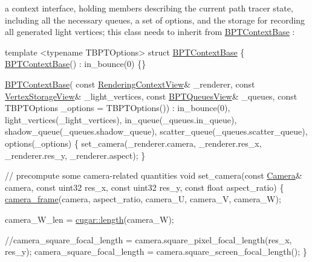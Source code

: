 \begin{DoxyParagraph}{}
\label{_b_p_t_lib_page_TBPTContext}%
%

\begin{DoxyEnumerate}
\item a context interface, holding members describing the current path tracer state, including all the necessary queues, a set of options, and the storage for recording all generated light vertices; this class needs to inherit from \hyperlink{struct_b_p_t_context_base}{B\+P\+T\+Context\+Base} \+: ~\newline

\begin{DoxyCodeInclude}
\textcolor{keyword}{template} <\textcolor{keyword}{typename} TBPTOptions>
\textcolor{keyword}{struct }\hyperlink{struct_b_p_t_context_base}{BPTContextBase}
\{
    \hyperlink{struct_b_p_t_context_base}{BPTContextBase}() :
        in\_bounce(0) \{\}

    \hyperlink{struct_b_p_t_context_base}{BPTContextBase}(
        \textcolor{keyword}{const} \hyperlink{struct_rendering_context_view}{RenderingContextView}& \_renderer,
        \textcolor{keyword}{const} \hyperlink{struct_vertex_storage_view}{VertexStorageView}&   \_light\_vertices,
        \textcolor{keyword}{const} \hyperlink{struct_b_p_t_queues_view}{BPTQueuesView}&       \_queues,
        \textcolor{keyword}{const} TBPTOptions           \_options = TBPTOptions()) :
        in\_bounce(0),
        light\_vertices(\_light\_vertices),
        in\_queue(\_queues.in\_queue),
        shadow\_queue(\_queues.shadow\_queue),
        scatter\_queue(\_queues.scatter\_queue),
        options(\_options)
    \{
        set\_camera(\_renderer.camera, \_renderer.res\_x, \_renderer.res\_y, \_renderer.aspect);
    \}

    \textcolor{comment}{// precompute some camera-related quantities}
    \textcolor{keywordtype}{void} set\_camera(\textcolor{keyword}{const} \hyperlink{struct_camera}{Camera}& camera, \textcolor{keyword}{const} uint32 res\_x, \textcolor{keyword}{const} uint32 res\_y, \textcolor{keyword}{const} \textcolor{keywordtype}{float} 
      aspect\_ratio)
    \{
        \hyperlink{group___camera_module_gaac6a57c4883a499e09399d5f617eccaf}{camera\_frame}(camera, aspect\_ratio, camera\_U, camera\_V, camera\_W);

        camera\_W\_len = \hyperlink{group___basic_ga6a0f89325f62dc313d300e36f2a26b55}{cugar::length}(camera\_W);

        \textcolor{comment}{//camera\_square\_focal\_length = camera.square\_pixel\_focal\_length(res\_x, res\_y);}
        camera\_square\_focal\_length = camera.square\_screen\_focal\_length();
    \}


\end{DoxyCodeInclude}
\end{DoxyEnumerate}
\end{DoxyParagraph}
